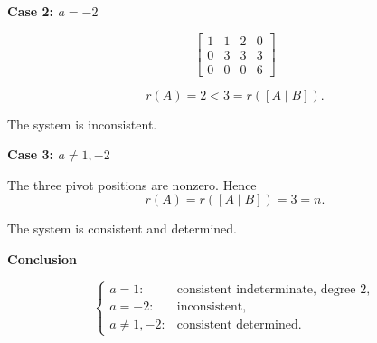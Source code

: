 \begin{answer}
    \textbf{Case 2: $a=-2$}

    $$
    \left[
    \begin{array}{ccc|c}
    1&1&2&0\\
    0&3&3&3\\
    0&0&0&6
    \end{array}
    \right]
    $$

    $$
    r(A)=2<3=r([A\mid B]).
    $$

    The system is inconsistent.

    \textbf{Case 3: $a\neq1,-2$}

    The three pivot positions
    are nonzero. Hence
    $$
    r(A)=r([A\mid B])=3=n.
    $$

    The system is consistent
    and determined.

    \textbf{Conclusion}

    $$
    \boxed{
    \begin{cases}
    a=1:
    &\text{consistent indeterminate, degree }2,\\
    a=-2:
    &\text{inconsistent},\\
    a\neq1,-2:
    &\text{consistent determined}.
    \end{cases}
    }
    $$
\end{answer}
